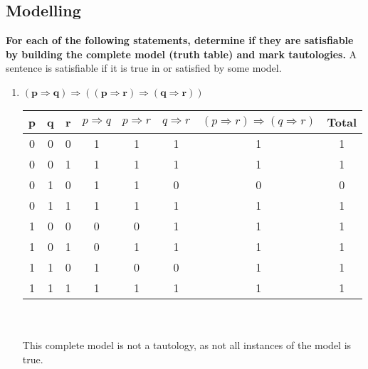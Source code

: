 \subsection{Modelling}
\begin{large}
  \textbf{For each of the following statements, determine if they are satisfiable by building the complete model (truth table) and mark tautologies.}
  A sentence is satisfiable if it is true in or satisfied by some model.

  \begin{enumerate}
    \item $ \mathbf{(p \Rightarrow q) \Rightarrow ((p \Rightarrow r) \Rightarrow ( q \Rightarrow r ))}$

          \begin{tabular}{c|c|c|c|c|c|c||c}
            p & q & r & $ p \Rightarrow q $ & $ p \Rightarrow r $ & $ q \Rightarrow r $ & $ (p \Rightarrow r) \Rightarrow ( q \Rightarrow r ) $ & Total \\
            \hline \hline
            0 & 0 & 0 & 1                   & 1                   & 1                   & 1                                                     & 1     \\
            \hline
            0 & 0 & 1 & 1                   & 1                   & 1                   & 1                                                     & 1     \\
            \hline
            0 & 1 & 0 & 1                   & 1                   & 0                   & 0                                                     & 0     \\
            \hline
            0 & 1 & 1 & 1                   & 1                   & 1                   & 1                                                     & 1     \\
            \hline
            1 & 0 & 0 & 0                   & 0                   & 1                   & 1                                                     & 1     \\
            \hline
            1 & 0 & 1 & 0                   & 1                   & 1                   & 1                                                     & 1     \\
            \hline
            1 & 1 & 0 & 1                   & 0                   & 0                   & 1                                                     & 1     \\
            \hline
            1 & 1 & 1 & 1                   & 1                   & 1                   & 1                                                     & 1     \\
            \hline
          \end{tabular}
          \\ \\
          This complete model is not a tautology, as not all instances of the model is true.


\end{enumerate}
\end{large}
